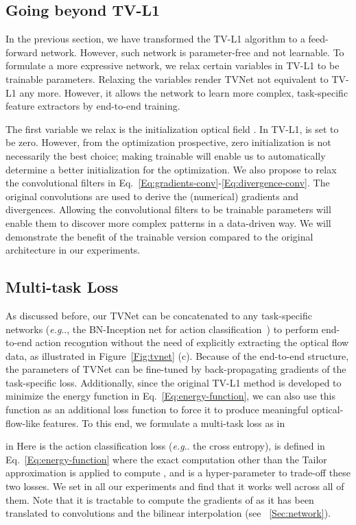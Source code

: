 \documentclass[10pt,twocolumn,letterpaper]{article}
\makeatletter
\DeclareRobustCommand\onedot{\futurelet\@let@token\@onedot}
\def\@onedot{\ifx\@let@token.\else.\null\fi\xspace}
\def\eg{\emph{e.g}\onedot} \def\Eg{\emph{E.g}\onedot}
\makeatother
\begin{document}
\subsection{Going beyond TV-L1}
\label{Sec:variable-relaxation}

In the previous section, we have transformed the TV-L1 algorithm to a feed-forward network. However, such network is parameter-free and not learnable. To formulate a more expressive network, we relax certain variables in TV-L1 to be trainable parameters. Relaxing the variables render TVNet not equivalent to TV-L1 any more. However, it allows the network to learn more complex, task-specific feature extractors by end-to-end training.

The first variable we relax is the initialization optical field . In TV-L1,  is set to be zero. However, from the optimization prospective, zero initialization is not necessarily the best choice; making  trainable will enable us to automatically determine a better initialization for the optimization.
We also propose to relax the convolutional filters in Eq.~\eqref{Eq:gradients-conv}-\eqref{Eq:divergence-conv}. The original convolutions are used to derive the (numerical) gradients and divergences.
Allowing the convolutional filters to be trainable parameters will enable them to discover more complex patterns in a data-driven way. We will demonstrate the benefit of the trainable version compared to the original architecture in our experiments.

\subsection{Multi-task Loss}

As discussed before, our TVNet can be concatenated to any task-specific networks (\eg, the BN-Inception net for action classification~\cite{Wang_ECCV16}) to perform end-to-end action recogntion without the need of explicitly extracting the optical flow data, as illustrated in Figure~\ref{Fig:tvnet} (c).
Because of the end-to-end structure, the parameters of TVNet can be fine-tuned by back-propagating gradients of the task-specific loss.
Additionally, since the original TV-L1 method is developed to minimize the energy function in Eq.~\eqref{Eq:energy-function}, we can also use this function as an additional loss function to force it to produce meaningful optical-flow-like features. To this end, we formulate a multi-task loss as
 in

 in \noindent
Here  is the action classification loss (\eg the cross entropy),  is defined in Eq.~\eqref{Eq:energy-function} where the exact computation other than the Tailor approximation is applied to compute , and  is a hyper-parameter to trade-off these two losses. We  set  in all our experiments and find that it works well across all of them.
Note that it is tractable to compute the gradients of  as it has been translated to convolutions and the bilinear interpolation (see \textsection~\ref{Sec:network}).
\end{document}
